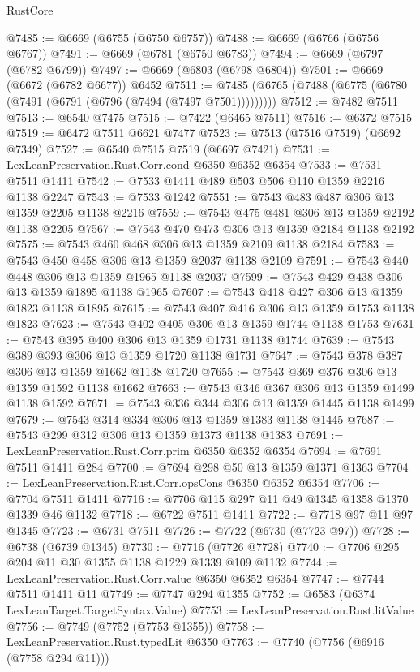 \begin{lexlean}{RustCore}
\begin{coremodule}
@7485 := @6669 (@6755 (@6750 @6757))
@7488 := @6669 (@6766 (@6756 @6767))
@7491 := @6669 (@6781 (@6750 @6783))
@7494 := @6669 (@6797 (@6782 @6799))
@7497 := @6669 (@6803 (@6798 @6804))
@7501 := @6669 (@6672 (@6782 @6677)) @6452
@7511 := @7485 (@6765 (@7488 (@6775 (@6780 (@7491 (@6791 (@6796 (@7494 (@7497 @7501)))))))))
@7512 := @7482 @7511
@7513 := @6540 @7475
@7515 := @7422 (@6465 @7511)
@7516 := @6372 @7515
@7519 := @6472 @7511 @6621 @7477
@7523 := @7513 (@7516 @7519) (@6692 @7349)
@7527 := @6540 @7515 @7519 (@6697 @7421)
@7531 := LexLeanPreservation.Rust.Corr.cond @6350 @6352 @6354
@7533 := @7531 @7511 @1411
@7542 := @7533 @1411 @489 @503 @506 @110 @1359 @2216 @1138 @2247
@7543 := @7533 @1242
@7551 := @7543 @483 @487 @306 @13 @1359 @2205 @1138 @2216
@7559 := @7543 @475 @481 @306 @13 @1359 @2192 @1138 @2205
@7567 := @7543 @470 @473 @306 @13 @1359 @2184 @1138 @2192
@7575 := @7543 @460 @468 @306 @13 @1359 @2109 @1138 @2184
@7583 := @7543 @450 @458 @306 @13 @1359 @2037 @1138 @2109
@7591 := @7543 @440 @448 @306 @13 @1359 @1965 @1138 @2037
@7599 := @7543 @429 @438 @306 @13 @1359 @1895 @1138 @1965
@7607 := @7543 @418 @427 @306 @13 @1359 @1823 @1138 @1895
@7615 := @7543 @407 @416 @306 @13 @1359 @1753 @1138 @1823
@7623 := @7543 @402 @405 @306 @13 @1359 @1744 @1138 @1753
@7631 := @7543 @395 @400 @306 @13 @1359 @1731 @1138 @1744
@7639 := @7543 @389 @393 @306 @13 @1359 @1720 @1138 @1731
@7647 := @7543 @378 @387 @306 @13 @1359 @1662 @1138 @1720
@7655 := @7543 @369 @376 @306 @13 @1359 @1592 @1138 @1662
@7663 := @7543 @346 @367 @306 @13 @1359 @1499 @1138 @1592
@7671 := @7543 @336 @344 @306 @13 @1359 @1445 @1138 @1499
@7679 := @7543 @314 @334 @306 @13 @1359 @1383 @1138 @1445
@7687 := @7543 @299 @312 @306 @13 @1359 @1373 @1138 @1383
@7691 := LexLeanPreservation.Rust.Corr.prim @6350 @6352 @6354
@7694 := @7691 @7511 @1411 @284
@7700 := @7694 @298 @50 @13 @1359 @1371 @1363
@7704 := LexLeanPreservation.Rust.Corr.opsCons @6350 @6352 @6354
@7706 := @7704 @7511 @1411
@7716 := @7706 @115 @297 @11 @49 @1345 @1358 @1370 @1339 @46 @1132
@7718 := @6722 @7511 @1411
@7722 := @7718 @97 @11 @97 @1345
@7723 := @6731 @7511
@7726 := @7722 (@6730 (@7723 @97))
@7728 := @6738 (@6739 @1345)
@7730 := @7716 (@7726 @7728)
@7740 := @7706 @295 @204 @11 @30 @1355 @1138 @1229 @1339 @109 @1132
@7744 := LexLeanPreservation.Rust.Corr.value @6350 @6352 @6354
@7747 := @7744 @7511 @1411 @11
@7749 := @7747 @294 @1355
@7752 := @6583 (@6374 LexLeanTarget.TargetSyntax.Value)
@7753 := LexLeanPreservation.Rust.litValue
@7756 := @7749 (@7752 (@7753 @1355))
@7758 := LexLeanPreservation.Rust.typedLit @6350
@7763 := @7740 (@7756 (@6916 (@7758 @294 @11)))

\end{coremodule}
\end{lexlean}
